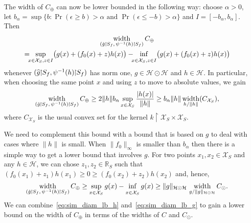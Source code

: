 \documentclass[10pt]{amsart}
\theoremstyle{definition}\newtheorem{defi}[theo]{Definition}\newtheorem{rema}[theo]{Remark}\newtheorem{exam}[theo]{Example}\newtheorem{exem}[theo]{Example}\newtheorem{nota}[theo]{Notation}
\theoremstyle{remark}
\DeclareMathOperator*{\infd}{inf\vphantom{p}}
\DeclareMathOperator{\diam}{width}
\newcommand{\restrr}
{\!\!\upharpoonright\!\!}
\newcommand{\R}{\mathbb{R}}
\newcommand{\X}{\mathcal{X}}
\newcommand{\cH}{\mathcal{H}}
\newcommand*{\mk}{\mkern -1mu}
\let\oldhat\hat
\renewcommand*{\hat}[1]{\mathchoice{\widehat{#1}}{\widehat{#1}}{\oldhat{#1}}{\oldhat{#1}}}
\let\originalleft\left
\let\originalright\right
\renewcommand{\left}{\mathopen{}\mathclose\bgroup\originalleft}
\renewcommand{\right}{\aftergroup\egroup\originalright}
\begin{document}
The width of $C_{\oplus}$ can now be lower bounded in the following way: choose $\alpha > 0$, let $b_\alpha = \sup\{b : \Pr(\epsilon \geq b) > \alpha \text{ and } \Pr(\epsilon \leq - b) > \alpha \}$ and $I = [-b_\alpha, b_\alpha]$. Then
\begin{multline*}
\diam_{\left(\hat g \mk\upharpoonright\mk S_f,\,\psi^{-1}(h) \mk\upharpoonright\mk S_f\right)} C_{\oplus}\\
=\!\!\! \sup_{x\in\X_S, z \in I } \bigl(g(x) + (f_0(x) + z) h(x)\bigr) -\!\!\! \infd_{x\in \X_S, z \in I}  \bigl(g(x) + (f_0(x) + z)h(x)\bigr)
\end{multline*}
whenever $(\hat g\restrr S_f,\psi^{-1}(h)\restrr S_f)$ has norm one, $g\in \cH\odot \cH$ and $h\in \cH$. In particular, when choosing the same point $x$ and using $z$ to move to absolute values, we gain
\begin{equation}\label{eq:sim_diam_lb_h}
\diam_{\left(\hat g\mk\upharpoonright\mk S_f,\,\psi^{-1}(h)\mk\upharpoonright\mk S_f\right)} C_\oplus \geq 2 \|h\| b_\alpha \sup_{x \in \X_S} \frac{|h(x)|}{\|h\|} \geq b_\alpha \|h\| \diam_{h/\|h\|}(C_{\X_S}),
\end{equation}
where $C_{\X_S}$ is the usual convex set for the kernel $k\restrr \X_S \times \X_S$.

We need to complement this bound with a bound that is based on $g$ to deal with cases where $\|h\|$ is small. When $\|f_0\|_\infty$ is smaller than $b_\alpha$ then there is a simple way to get a lower bound that involves $g$. For two points $x_1,x_2 \in \X_S$ and any $h\in \cH$, we can chose $z_1,z_2 \in \R_S$ such that $(f_0(x_1) + z_1) h(x_1) \geq 0 \geq (f_0(x_2) + z_2) h(x_2)$ and, hence,
\begin{equation}\label{eq:sim_diam_lb_g}
\diam_{\left(\hat g\mk \upharpoonright\mk  S_f,\,\psi^{-1}(h)\mk\upharpoonright\mk S_f\right)} C_\oplus \geq \sup_{x\in \X_S} g(x) - \infd_{x \in \X_S} g(x) \geq \|g\|_{\cH \odot \cH} \, \diam_{g/\|g\|_{\cH\odot \cH}} C_\odot.
\end{equation}
We can combine~\eqref{eq:sim_diam_lb_h} and~\eqref{eq:sim_diam_lb_g} to gain a lower bound on the width of $C_\oplus$ in terms of the widths of $C$ and $C_\odot$.
\end{document}
